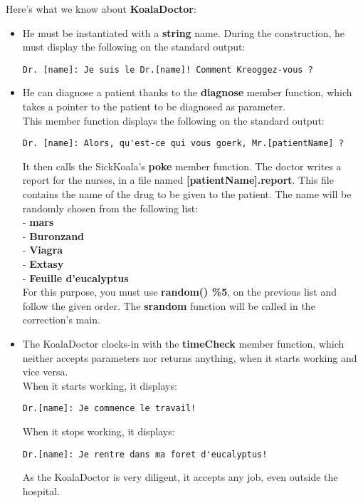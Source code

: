 Here's what we know about \textbf{KoalaDoctor}:
\begin{itemize}

  \item He must be instantiated with a \textbf{string} name. During the construction,
    he must display the following on the standard output:
    \begin{lstlisting}
Dr. [name]: Je suis le Dr.[name]! Comment Kreoggez-vous ?
    \end{lstlisting}

  \item He can diagnose a patient thanks to the \textbf{diagnose} member function,
    which takes a pointer to the patient to be diagnosed as parameter.\\
    This member function displays the following on the standard output:
    \begin{lstlisting}
Dr. [name]: Alors, qu'est-ce qui vous goerk, Mr.[patientName] ?
    \end{lstlisting}

    It then calls the SickKoala's \textbf{poke} member function. The doctor writes
    a report for the nurses, in a file named \textbf{[patientName].report}. This
    file contains the name of the drug to be given to the patient. The name will
    be randomly chosen from the following list:\\
    - \textbf{mars}\\
    - \textbf{Buronzand}\\
    - \textbf{Viagra}\\
    - \textbf{Extasy}\\
    - \textbf{Feuille d'eucalyptus}\\

    For this purpose, you must use \textbf{random() \%5}, on the previous list and
    follow the given order. The \textbf{srandom} function will be called in the
    correction's main.\\

  \item The KoalaDoctor clocks-in with the \textbf{timeCheck} member function, which
    neither accepts parameters nor returns anything, when it starts working and vice
    versa.\\
    When it starts working, it displays:
    \begin{lstlisting}
Dr.[name]: Je commence le travail!
    \end{lstlisting}

    When it stops working, it displays:
    \begin{lstlisting}
Dr.[name]: Je rentre dans ma foret d'eucalyptus!
    \end{lstlisting}

    As the KoalaDoctor is very diligent, it accepts any job, even outside the hospital.
\end{itemize}

